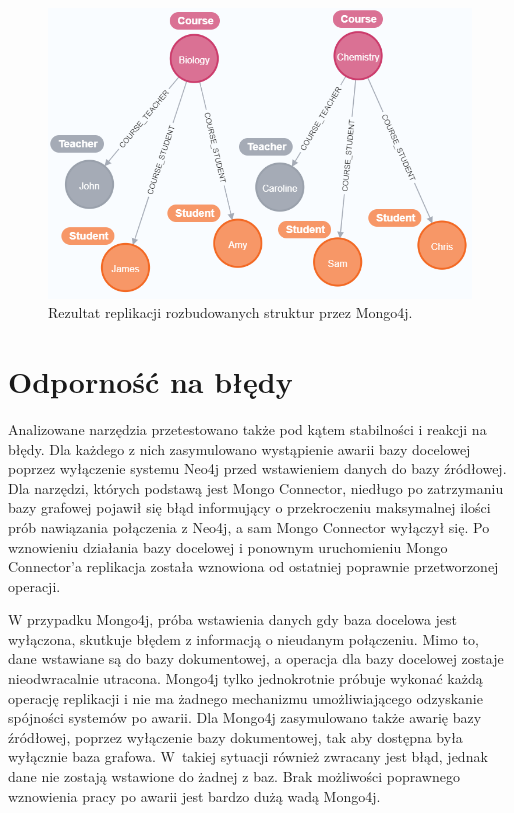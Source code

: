 \documentclass[a4paper,twoside,12pt]{book}
\begin{document}
\begin{figure}[!h]
\centering
\includegraphics[width=14cm]{images/rozbudowana_struktura_mongo4j.png}
\caption{Rezultat replikacji rozbudowanych struktur przez Mongo4j.}
\label{fig:graf-rozbudowana-struktura-mongo4j}
\end{figure}

\section{Odporność na błędy} 

Analizowane narzędzia przetestowano także pod kątem stabilności i reakcji na błędy. Dla każdego z nich zasymulowano wystąpienie awarii bazy docelowej poprzez wyłączenie systemu Neo4j przed wstawieniem danych do bazy źródłowej. Dla narzędzi, których podstawą jest Mongo Connector, niedługo po zatrzymaniu bazy grafowej pojawił się błąd informujący o przekroczeniu maksymalnej ilości prób nawiązania połączenia z Neo4j, a sam Mongo Connector wyłączył się. Po wznowieniu działania bazy docelowej i ponownym uruchomieniu Mongo Connector'a replikacja została wznowiona od ostatniej poprawnie przetworzonej operacji. 

W przypadku Mongo4j, próba wstawienia danych gdy baza docelowa jest wyłączona, skutkuje błędem z informacją o nieudanym połączeniu. Mimo to, dane wstawiane są do bazy dokumentowej, a operacja dla bazy docelowej zostaje nieodwracalnie utracona. Mongo4j tylko jednokrotnie próbuje wykonać każdą operację replikacji i nie ma żadnego mechanizmu umożliwiającego odzyskanie spójności systemów po awarii. Dla Mongo4j zasymulowano także awarię bazy źródłowej, poprzez wyłączenie bazy dokumentowej, tak aby dostępna była wyłącznie baza grafowa. W~takiej sytuacji również zwracany jest błąd, jednak dane nie zostają wstawione do żadnej z baz. Brak możliwości poprawnego wznowienia pracy po awarii jest bardzo dużą wadą Mongo4j.    
\end{document}
